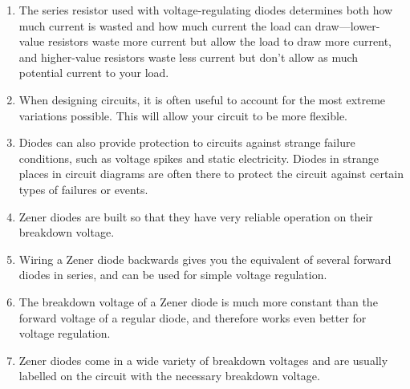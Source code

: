 \begin{enumerate}
\item The series resistor used with voltage-regulating diodes determines both how much current is wasted and how much current the load can draw---lower-value resistors waste more current but allow the load to draw more current, and higher-value resistors waste less current but don't allow as much potential current to your load.
\item When designing circuits, it is often useful to account for the most extreme variations possible.  This will allow your circuit to be more flexible.
\item Diodes can also provide protection to circuits against strange failure conditions, such as voltage spikes and static electricity.  Diodes in strange places in circuit diagrams are often there to protect the circuit against certain types of failures or events.
\item Zener diodes are built so that they have very reliable operation on their breakdown voltage.  
\item Wiring a Zener diode backwards gives you the equivalent of several forward diodes in series, and can be used for simple voltage regulation.
\item The breakdown voltage of a Zener diode is much more constant than the forward voltage of a regular diode, and therefore works even better for voltage regulation.
\item Zener diodes come in a wide variety of breakdown voltages and are usually labelled on the circuit with the necessary breakdown voltage.
\end{enumerate}

\applysection


